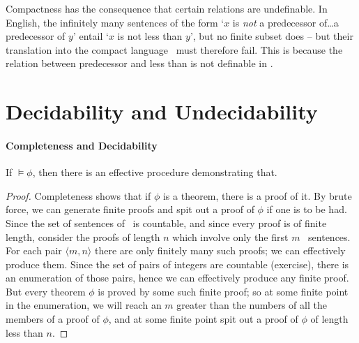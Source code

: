 Compactness has the consequence that certain relations are undefinable. In English, the infinitely many sentences of the form `$x$ is \emph{not} a predecessor of\ldots a predecessor of $y$' entail `$x$ is not less than $y$', but no finite subset does – but their translation into the compact language \ltwo\ must therefore fail. This is because the relation between predecessor and less than is not definable in \ltwo.


% 




\section{Decidability and Undecidability}
\paragraph{Completeness and Decidability}



\begin{theorem}
 If $\vDash\phi$, then there is an effective procedure demonstrating that.  \begin{proof}
		{Completeness shows that if $\phi$ is a theorem, there is a proof of it. By brute force, we can generate finite proofs and spit out a proof of $\phi$ if one is to be had. Since the set of sentences of \ltwo\ is countable, and since every proof is of finite length, consider the proofs of length $n$ which involve only the first $m$ \ltwo\ sentences. For each pair $\langle m,n\rangle$ there are only finitely many such proofs; we can effectively produce them. Since the set of pairs of integers are countable (exercise), there is an enumeration of those pairs, hence we can effectively produce any finite proof.
		But every theorem $\phi$ is proved by some such finite proof; so at some finite point in the enumeration, we will reach an $m$ greater than the numbers of all the members of a proof of $\phi$, and at some finite point spit out a proof of $\phi$ of length less than $n$.}
	\end{proof}
\end{theorem}




